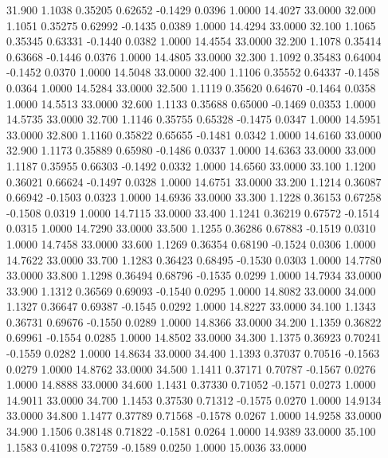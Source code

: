   31.900   1.1038   0.35205   0.62652  -0.1429   0.0396   1.0000  14.4027  33.0000
  32.000   1.1051   0.35275   0.62992  -0.1435   0.0389   1.0000  14.4294  33.0000
  32.100   1.1065   0.35345   0.63331  -0.1440   0.0382   1.0000  14.4554  33.0000
  32.200   1.1078   0.35414   0.63668  -0.1446   0.0376   1.0000  14.4805  33.0000
  32.300   1.1092   0.35483   0.64004  -0.1452   0.0370   1.0000  14.5048  33.0000
  32.400   1.1106   0.35552   0.64337  -0.1458   0.0364   1.0000  14.5284  33.0000
  32.500   1.1119   0.35620   0.64670  -0.1464   0.0358   1.0000  14.5513  33.0000
  32.600   1.1133   0.35688   0.65000  -0.1469   0.0353   1.0000  14.5735  33.0000
  32.700   1.1146   0.35755   0.65328  -0.1475   0.0347   1.0000  14.5951  33.0000
  32.800   1.1160   0.35822   0.65655  -0.1481   0.0342   1.0000  14.6160  33.0000
  32.900   1.1173   0.35889   0.65980  -0.1486   0.0337   1.0000  14.6363  33.0000
  33.000   1.1187   0.35955   0.66303  -0.1492   0.0332   1.0000  14.6560  33.0000
  33.100   1.1200   0.36021   0.66624  -0.1497   0.0328   1.0000  14.6751  33.0000
  33.200   1.1214   0.36087   0.66942  -0.1503   0.0323   1.0000  14.6936  33.0000
  33.300   1.1228   0.36153   0.67258  -0.1508   0.0319   1.0000  14.7115  33.0000
  33.400   1.1241   0.36219   0.67572  -0.1514   0.0315   1.0000  14.7290  33.0000
  33.500   1.1255   0.36286   0.67883  -0.1519   0.0310   1.0000  14.7458  33.0000
  33.600   1.1269   0.36354   0.68190  -0.1524   0.0306   1.0000  14.7622  33.0000
  33.700   1.1283   0.36423   0.68495  -0.1530   0.0303   1.0000  14.7780  33.0000
  33.800   1.1298   0.36494   0.68796  -0.1535   0.0299   1.0000  14.7934  33.0000
  33.900   1.1312   0.36569   0.69093  -0.1540   0.0295   1.0000  14.8082  33.0000
  34.000   1.1327   0.36647   0.69387  -0.1545   0.0292   1.0000  14.8227  33.0000
  34.100   1.1343   0.36731   0.69676  -0.1550   0.0289   1.0000  14.8366  33.0000
  34.200   1.1359   0.36822   0.69961  -0.1554   0.0285   1.0000  14.8502  33.0000
  34.300   1.1375   0.36923   0.70241  -0.1559   0.0282   1.0000  14.8634  33.0000
  34.400   1.1393   0.37037   0.70516  -0.1563   0.0279   1.0000  14.8762  33.0000
  34.500   1.1411   0.37171   0.70787  -0.1567   0.0276   1.0000  14.8888  33.0000
  34.600   1.1431   0.37330   0.71052  -0.1571   0.0273   1.0000  14.9011  33.0000
  34.700   1.1453   0.37530   0.71312  -0.1575   0.0270   1.0000  14.9134  33.0000
  34.800   1.1477   0.37789   0.71568  -0.1578   0.0267   1.0000  14.9258  33.0000
  34.900   1.1506   0.38148   0.71822  -0.1581   0.0264   1.0000  14.9389  33.0000
  35.100   1.1583   0.41098   0.72759  -0.1589   0.0250   1.0000  15.0036  33.0000
